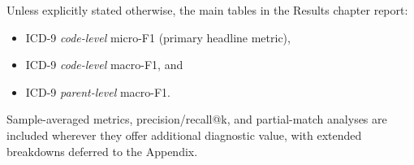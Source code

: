 Unless explicitly stated otherwise, the main tables in the Results chapter report:

\begin{itemize}
    \item ICD-9 \emph{code-level} micro-F1 (primary headline metric),
    \item ICD-9 \emph{code-level} macro-F1, and
    \item ICD-9 \emph{parent-level} macro-F1.
\end{itemize}

Sample-averaged metrics, precision/recall@k, and partial-match analyses are included wherever they offer additional diagnostic value, with extended breakdowns deferred to the Appendix.


